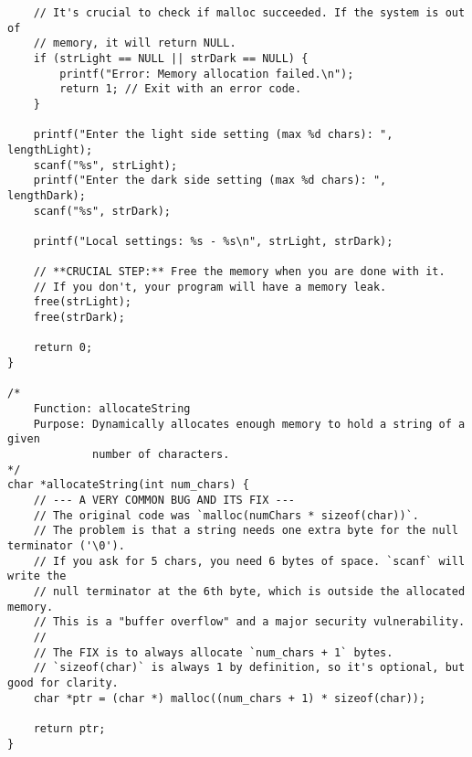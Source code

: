 \documentclass[11pt]{book}
\begin{document}
\begin{verbatim}
    // It's crucial to check if malloc succeeded. If the system is out of
    // memory, it will return NULL.
    if (strLight == NULL || strDark == NULL) {
        printf("Error: Memory allocation failed.\n");
        return 1; // Exit with an error code.
    }

    printf("Enter the light side setting (max %d chars): ", lengthLight);
    scanf("%s", strLight);
    printf("Enter the dark side setting (max %d chars): ", lengthDark);
    scanf("%s", strDark);

    printf("Local settings: %s - %s\n", strLight, strDark);

    // **CRUCIAL STEP:** Free the memory when you are done with it.
    // If you don't, your program will have a memory leak.
    free(strLight);
    free(strDark);

    return 0;
}

/*
    Function: allocateString
    Purpose: Dynamically allocates enough memory to hold a string of a given
             number of characters.
*/
char *allocateString(int num_chars) {
    // --- A VERY COMMON BUG AND ITS FIX ---
    // The original code was `malloc(numChars * sizeof(char))`.
    // The problem is that a string needs one extra byte for the null terminator ('\0').
    // If you ask for 5 chars, you need 6 bytes of space. `scanf` will write the
    // null terminator at the 6th byte, which is outside the allocated memory.
    // This is a "buffer overflow" and a major security vulnerability.
    //
    // The FIX is to always allocate `num_chars + 1` bytes.
    // `sizeof(char)` is always 1 by definition, so it's optional, but good for clarity.
    char *ptr = (char *) malloc((num_chars + 1) * sizeof(char));

    return ptr;
}

\end{verbatim}
\end{document}

